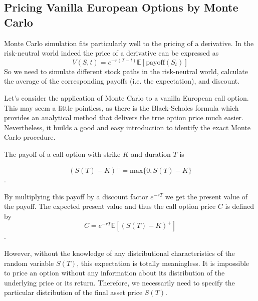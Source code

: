 \subsection{Pricing Vanilla European Options by Monte Carlo}
Monte Carlo simulation fits particularly well to the pricing of a derivative.
In the risk-neutral world indeed the price of a derivative can be expressed
as
\begin{equation}
V(S, t) = e^{-r(T-t)} \mathbb{E}[\textrm{payoff}(S_t)]
\end{equation}
So we need to simulate different stock paths in the risk-neutral world,
calculate the average of the corresponding payoffs (i.e. the expectation), 
and discount.

%

Let's consider the application of Monte Carlo to a
vanilla European call option. This may seem a little pointless, as there
is the Black-Scholes formula which provides an analytical method that delivers the
true option price much easier. Nevertheless, it builds a good and easy
introduction to identify the exact Monte Carlo procedure. 

The payoff of a call option with strike $K$ and duration $T$ is 

\begin{equation}
(S(T)−K)^+ = \textrm{max}\{0,S(T)−K\}
\end{equation}. 

By multiplying this payoff by a discount factor $e^{−rT}$ we get 
the present value of the payoff. 
The expected present value and thus the call option price $C$ is defined 
by
\begin{equation} 
C = e^{−rT} \mathbb{E}[(S(T) −K)^+ ]
\label{eq:call_payoff}
\end{equation}. 

However, without the knowledge of any distributional
characteristics of the random variable $S(T)$, this expectation is totally
meaningless. It is impossible to price an option without any information
about its distribution of the underlying price or its return. Therefore,
we necessarily need to specify the particular distribution of the final
asset price $S(T)$. 

